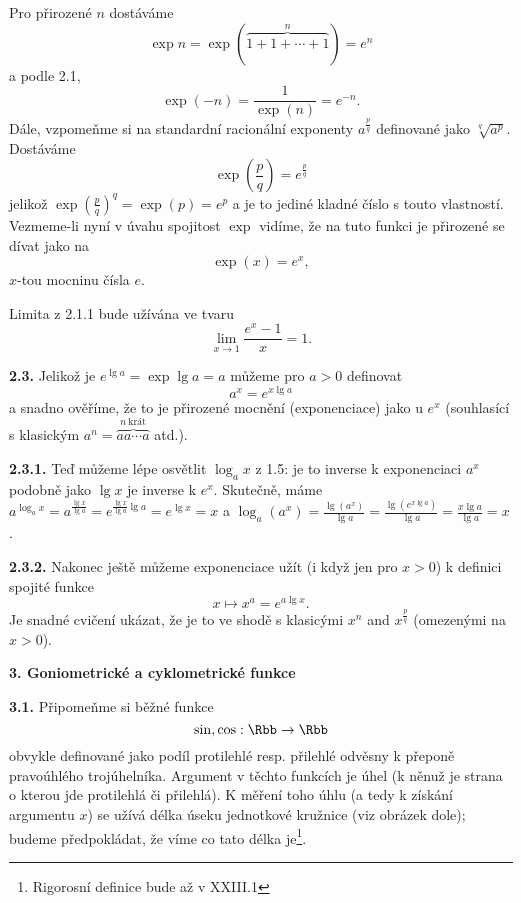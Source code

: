 \documentclass[12pt]{article}
\begin{document}
{Pro přirozené $n$ dostáváme
 $$
 \exp{n}=\exp(\overbrace{1+1+\cdots+1}^{n})=e^n
 $$
 a podle 2.1,
 $$
 \exp(-n)=\frac{1}{\exp(n)}=e^{-n}.
$$
Dále, vzpomeňme si na standardní racionální exponenty $a^{\frac{p}{q}}$ definované jako $\sqrt[q]{a^p}$. Dostáváme 
$$
\exp(\frac{p}{q})=e^{\frac{p}{q}}
$$
jelikož $\exp(\frac{p}{q})^q=\exp(p)=e^p$ a je to jediné kladné číslo s touto vlastností. Vezmeme-li nyní v úvahu spojitost $\exp$ vidíme, že na tuto funkci je přirozené se dívat jako na
$$
\exp(x)=e^x,
$$
 $x$-tou mocninu čísla $e$.

\medskip
Limita z 2.1.1   
bude užívána ve tvaru
 $$
 \lim_{x\to 1}\frac{e^x-1}{x}=1.
 $$

\bigskip

{\bf 2.3.} Jelikož je $e^{\lg a}=\exp\lg a= a$
můžeme pro $a>0$ definovat
$$
a^x=e^{x\lg a}
$$
a snadno ověříme, že to je přirozené mocnění (exponenciace) jako u $e^x$ 
(souhlasící s klasickým $a^n=\overbrace{a a\cdots a}^{n\ \text{kr\'at}}$ atd.).

\medskip

{\bf 2.3.1.} Teď můžeme lépe osvětlit $\log_ax$ z 1.5: je to inverse k exponenciaci $a^x$ podobně jako $\lg x$ je inverse k $e^x$. Skutečně, máme $a^{\log_ax}=a^{\frac{\lg x}{\lg a}}=
e^{\frac{\lg x}{\lg a}\lg a}=e^{\lg x}=x$  a $\log_a(a^x)=\frac{\lg(a^x)}{\lg a}=\frac{\lg(e^{x\lg a})}{\lg a}=\frac{x\lg a}{\lg a}=x$.

\medskip

{\bf 2.3.2.} Nakonec ještě můžeme exponenciace užít (i když jen pro $x>0$) k definici spojité funkce
$$
x\mapsto x^a= e^{a\lg x}.
$$
Je snadné cvičení ukázat, že je to ve shodě s klasicými $x^n$ and $x^{\frac{p}{q}}$ (omezenými na $x>0$).

\vskip10mm
 
 {\large\bf 3. Goniometrické a cyklometrické funkce}
 
 \bigskip
 
 {\bf 3.1.} Připomeňme si běžné funkce 
 $$
 \sin,\cos:\Rbb\to\Rbb
 $$
  obvykle definované jako podíl protilehlé resp. přilehlé odvěsny k přeponě pravoúhlého trojúhelníka. Argument v těchto funkcích je úhel (k něnuž je strana o kterou jde protilehlá či přilehlá). K měření toho úhlu  (a tedy k získání argumentu $x$) se užívá délka úseku jednotkové kružnice (viz obrázek dole);
 budeme předpokládat, že víme co tato délka je\footnote{Rigorosní definice bude až v  XXIII.1}.
 
 \vskip8mm
  
   \centerline{
}

}
\end{document}

